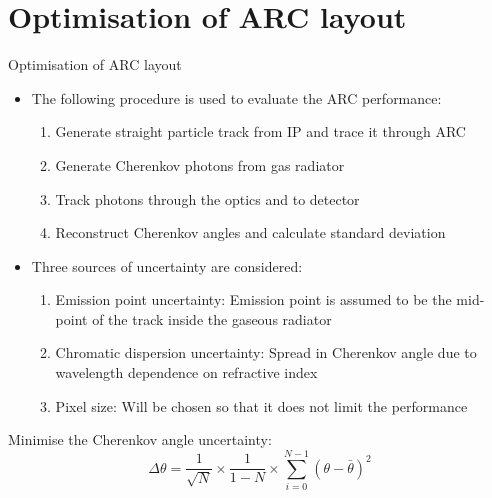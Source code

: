 \documentclass{beamer}
\begin{document}
\section{Optimisation of ARC layout}
\begin{frame}{Optimisation of ARC layout}
  \begin{itemize}
    \setlength\itemsep{0.7em}
    \item{The following procedure is used to evaluate the ARC performance:}
    \begin{enumerate}
      \setlength\itemsep{0.2em}
      \item{Generate straight particle track from IP and trace it through ARC}
      \item{Generate Cherenkov photons from gas radiator}
      \item{Track photons through the optics and to detector}
      \item{Reconstruct Cherenkov angles and calculate standard deviation}
    \end{enumerate}

    \item{Three sources of uncertainty are considered:}
    \begin{enumerate}
      \setlength\itemsep{0.2em}
      \item{Emission point uncertainty: Emission point is assumed to be the mid-point of the track inside the gaseous radiator}
      \item{Chromatic dispersion uncertainty: Spread in Cherenkov angle due to wavelength dependence on refractive index}
      \item{Pixel size: Will be chosen so that it does not limit the performance}
    \end{enumerate}
  \end{itemize}
  \begin{block}{Minimise the Cherenkov angle uncertainty:}
    \begin{equation*}
      \Delta\theta = \frac{1}{\sqrt{N}}\times\frac{1}{1 - N}\times\sum_{i = 0}^{N - 1}(\theta - \bar{\theta})^2
    \end{equation*}
  \end{block}
\end{frame}
\end{document}
